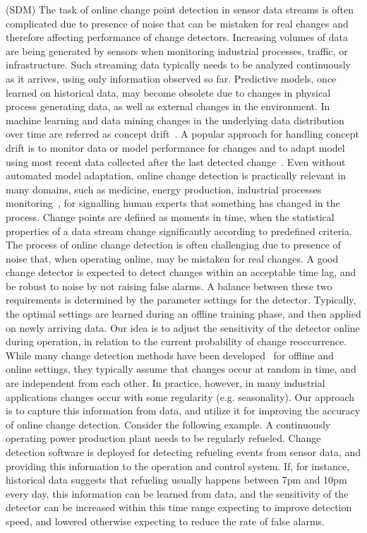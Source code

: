 (SDM)
The task of online change point detection in sensor data streams is often complicated due to presence of noise that can be mistaken for real changes and therefore affecting performance of change detectors.
Increasing volumes of data are being generated by sensors when monitoring industrial processes, traffic, or infrastructure.
Such streaming data typically needs to be analyzed continuously as it arrives, using only information observed so far.
Predictive models, once learned on historical data, may become obsolete due to changes in physical process generating data, as well as external changes in the environment.
In machine learning and data mining changes in the underlying data distribution over time are referred as concept drift~\cite{Widmer96}.
A popular approach for handling concept drift is to monitor data or model performance for changes and to adapt model using most recent data collected after the last detected change~\cite{GamaACMCS2014}.
Even without automated model adaptation, online change detection is practically relevant in many domains, such as medicine, energy production, industrial processes monitoring~\cite{Nikiforov}, for signalling human experts that something has changed in the process.
Change points are defined as moments in time, when the statistical properties of a data stream change significantly according to predefined criteria.
The process of online change detection is often challenging due to presence of noise that, when operating online, may be mistaken for real changes.
A good change detector is expected to detect changes within an acceptable time lag, and be robust to noise by not raising false alarms.
A balance between these two requirements is determined by the parameter settings for the detector.
Typically, the optimal settings are learned during an offline training phase, and then applied on newly arriving data.
Our idea is to adjust the sensitivity of the detector online during operation, in relation to the current probability of change reoccurrence.
While many change detection methods have been developed~\cite{Nikiforov,Polunchenko2011} for offline and online settings, they typically assume that changes occur at random in time, and are independent from each other.
In practice, however, in many industrial applications changes occur with some regularity (e.g. seasonality).
Our approach is to capture this information from data, and utilize it for improving the accuracy of online change detection.
%
Consider the following example.
A continuously operating power production plant needs to be regularly refueled.
Change detection software is deployed for detecting refueling events from sensor data, and providing this information to the operation and control system.
If, for instance, historical data suggests that refueling usually happens between 7pm and 10pm every day, this information can be learned from data, and the sensitivity of the detector can be increased within this time range expecting to improve detection speed, and lowered otherwise expecting to reduce the rate of false alarms.

